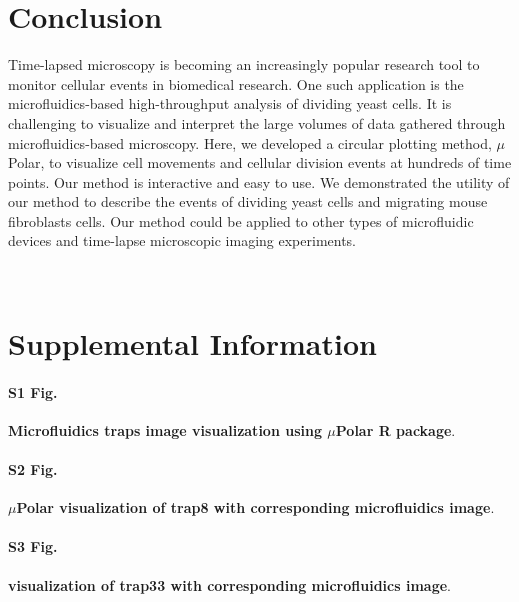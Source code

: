 \documentclass[conference]{IEEEtran}
\begin{document}
\section{Conclusion}
Time-lapsed  microscopy is becoming an increasingly popular research tool to monitor cellular events in biomedical research. One such application is the microfluidics-based high-throughput analysis of dividing yeast cells. It is challenging to visualize and interpret the large volumes of data gathered through microfluidics-based microscopy. Here, we developed a circular plotting method, $\mu$Polar, to visualize cell movements and cellular division events at hundreds of time points. Our method is interactive and easy to use. We demonstrated the utility of our method to describe the events of dividing yeast cells and migrating mouse fibroblasts cells. Our method could be  applied to other types of microfluidic devices and time-lapse microscopic imaging experiments.

\
\section{Supplemental Information}

\paragraph*{S1 Fig.}
\label{S1_Fig}
{\bf  Microfluidics traps image visualization using $\mu$Polar R package}. 


\paragraph*{S2 Fig.}
\label{S2_Fig}
{\bf  $\mu$Polar visualization of trap8 with corresponding microfluidics image}. 


\paragraph*{S3 Fig.}
\label{S3_Fig}
{\bf  visualization of trap33 with corresponding microfluidics image}. 
\end{document}
